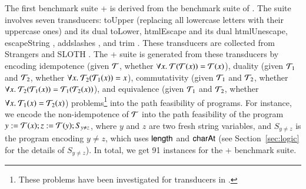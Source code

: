 The first benchmark suite {\transducerbench+} is derived from the {\transducerbench} benchmark suite of {\ostrich} \cite{CHL+19}.  The {\transducerbench} suite involves seven transducers: toUpper (replacing all lowercase letters with their uppercase ones) and its dual toLower, htmlEscape \cite{htmlEscape} and its dual htmlUnescape, escapeString \cite{escapeString}, addslashes \cite{addslashes}, and trim \cite{trim}. These transducers are collected from Strangers \cite{YABI14} and SLOTH \cite{HJLRV18}. The {\transducerbench+} suite is generated from these transducers by encoding idempotence (given $\mathcal{T}$, whether $\forall x.\ \mathcal{T}(\mathcal{T}(x)) = \mathcal{T}(x)$), duality (given $\mathcal{T}_1$ and $\mathcal{T}_2$, whether $\forall x.\ \mathcal{T}_2(\mathcal{T}_1(x)) = x$), commutativity (given $\mathcal{T}_1$ and $\mathcal{T}_2$, whether $\forall x.\ \mathcal{T}_2(\mathcal{T}_1(x)) = \mathcal{T}_1(\mathcal{T}_2(x))$), and equivalence (given $\mathcal{T}_1$ and $\mathcal{T}_2$, whether $\forall x.\ \mathcal{T}_1(x) = \mathcal{T}_2(x)$) problems\footnote{These problems have been investigated for transducers in \cite{BEK}.} into the path feasibility of {\slint} programs. For instance, we encode the non-idempotence of $\mathcal{T}$ into the path feasibility of the {\slint} program $y:=\mathcal{T}(x); z:=\mathcal{T}(y); S_{y \neq z}$, where $y$ and $z$ are two fresh string variables, and $S_{y \neq z}$ is the {\slint} program encoding $y \neq z$, which uses $\mathsf{length}$ and $\mathsf{charAt}$ (see Section~\ref{sec:logic} for the details of $S_{y \neq z}$). In total, we get 91 instances for the {\transducerbench+} benchmark suite. 
%
%
%
%


